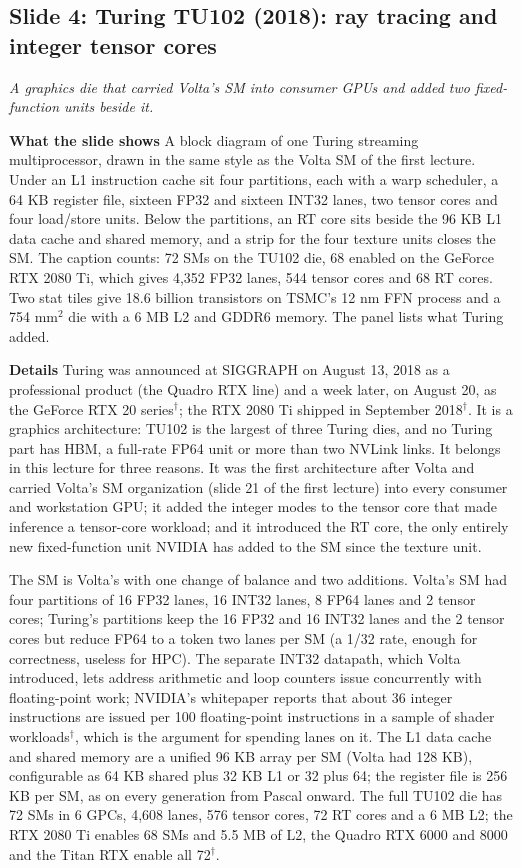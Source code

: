 \documentclass[11pt,letterpaper]{article}
\newcommand{\slide}[3]{%
  \subsection[Slide #1: #2]{Slide #1: #2}%
  {\color{muted}\itshape #3\par}\medskip}
\newcommand{\para}[1]{\medskip\noindent\textbf{#1}\quad}
\begin{document}
\slide{4}{Turing TU102 (2018): ray tracing and integer tensor cores}{A graphics die that carried Volta's SM into consumer GPUs and added two fixed-function units beside it.}

\para{What the slide shows} A block diagram of one Turing streaming multiprocessor, drawn in the same style as the Volta SM of the first lecture. Under an L1 instruction cache sit four partitions, each with a warp scheduler, a 64 KB register file, sixteen FP32 and sixteen INT32 lanes, two tensor cores and four load/store units. Below the partitions, an RT core sits beside the 96 KB L1 data cache and shared memory, and a strip for the four texture units closes the SM. The caption counts: 72 SMs on the TU102 die, 68 enabled on the GeForce RTX 2080 Ti, which gives 4,352 FP32 lanes, 544 tensor cores and 68 RT cores. Two stat tiles give 18.6 billion transistors on TSMC's 12 nm FFN process and a 754 mm$^2$ die with a 6 MB L2 and GDDR6 memory. The panel lists what Turing added.

\para{Details} Turing was announced at SIGGRAPH on August 13, 2018 as a professional product (the Quadro RTX line) and a week later, on August 20, as the GeForce RTX 20 series$^\dagger$; the RTX 2080 Ti shipped in September 2018$^\dagger$. It is a graphics architecture: TU102 is the largest of three Turing dies, and no Turing part has HBM, a full-rate FP64 unit or more than two NVLink links. It belongs in this lecture for three reasons. It was the first architecture after Volta and carried Volta's SM organization (slide 21 of the first lecture) into every consumer and workstation GPU; it added the integer modes to the tensor core that made inference a tensor-core workload; and it introduced the RT core, the only entirely new fixed-function unit NVIDIA has added to the SM since the texture unit.

The SM is Volta's with one change of balance and two additions. Volta's SM had four partitions of 16 FP32 lanes, 16 INT32 lanes, 8 FP64 lanes and 2 tensor cores; Turing's partitions keep the 16 FP32 and 16 INT32 lanes and the 2 tensor cores but reduce FP64 to a token two lanes per SM (a 1/32 rate, enough for correctness, useless for HPC). The separate INT32 datapath, which Volta introduced, lets address arithmetic and loop counters issue concurrently with floating-point work; NVIDIA's whitepaper reports that about 36 integer instructions are issued per 100 floating-point instructions in a sample of shader workloads$^\dagger$, which is the argument for spending lanes on it. The L1 data cache and shared memory are a unified 96 KB array per SM (Volta had 128 KB), configurable as 64 KB shared plus 32 KB L1 or 32 plus 64; the register file is 256 KB per SM, as on every generation from Pascal onward. The full TU102 die has 72 SMs in 6 GPCs, 4,608 lanes, 576 tensor cores, 72 RT cores and a 6 MB L2; the RTX 2080 Ti enables 68 SMs and 5.5 MB of L2, the Quadro RTX 6000 and 8000 and the Titan RTX enable all 72$^\dagger$.
\end{document}
